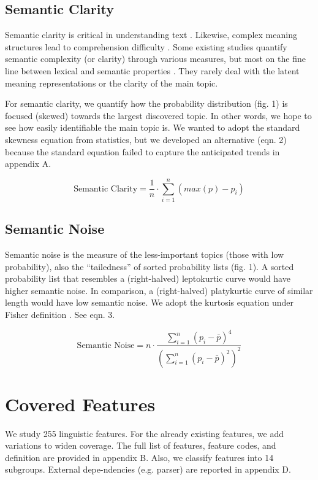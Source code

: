 \documentclass[11pt]{article}
\begin{document}
\subsection{Semantic Clarity}
Semantic clarity is critical in understanding text \cite{peabody2016towards}. Likewise, complex meaning structures lead to comprehension difficulty \citep{pires2017towards}. Some existing studies quantify semantic complexity (or clarity) through various measures, but most on the fine line between lexical and semantic properties \citep{Collins-Thompson:14}. They rarely deal with the latent meaning representations or the clarity of the main topic.

For semantic clarity, we quantify how the probability distribution (fig. 1) is focused (skewed) towards the largest discovered topic. In other words, we hope to see how easily identifiable the main topic is. We wanted to adopt the standard skewness equation from statistics, but we developed an alternative (eqn. 2) because the standard equation failed to capture the anticipated trends in appendix A.

\begin{equation} \label{eq2}
\text{Semantic Clarity} = \frac{1}{n} \cdot \sum_{i=1}^{n}  (max(p) - p_{i})
\end{equation}

\subsection{Semantic Noise}
Semantic noise is the measure of the less-important topics (those with low probability), also the ``tailedness'' of sorted probability lists (fig. 1). A sorted probability list that resembles a (right-halved) leptokurtic curve would have higher semantic noise. In comparison, a (right-halved) platykurtic curve of similar length would have low semantic noise. We adopt the kurtosis equation under Fisher definition \citep{kokoska2000crc}. See eqn. 3.

\begin{equation} \label{eq3}
\text{Semantic Noise} = n \cdot \frac{\sum_{i=1}^{n} (p_i - \bar{p})^4}{(\sum_{i=1}^{n} (p_i - \bar{p})^2)^2}
\end{equation}

\section{Covered Features}
We study 255 linguistic features. For the already existing features, we add variations to widen coverage. The full list of features, feature codes, and definition are provided in appendix B. Also, we classify features into 14 subgroups. External depe-ndencies (e.g. parser) are reported in appendix D.
\end{document}
